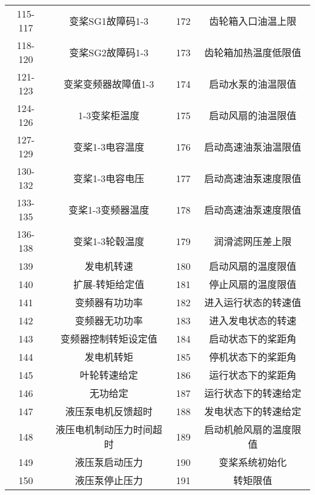 {\begin{table}[H]
{{\begin{tabular}{cccc}
            115-117 & 变桨SG1故障码1-3    & 172     & 齿轮箱入口油温上限    \\
            118-120 & 变桨SG2故障码1-3    & 173     & 齿轮箱加热温度低限值   \\
            121-123 & 变桨变频器故障值1-3    & 174     & 启动水泵的油温限值    \\
            124-126 & 1-3变桨柜温度       & 175     & 启动风扇的油温限值    \\
            127-129 & 变桨1-3电容温度      & 176     & 启动高速油泵油温限值   \\
            130-132 & 变桨1-3电容电压      & 177     & 启动高速油泵速度限值   \\
            133-135 & 变桨1-3变频器温度     & 178     & 启动高速油泵速度限值   \\
            136-138 & 变桨1-3轮毂温度      & 179     & 润滑滤网压差上限     \\
            139     & 发电机转速          & 180     & 启动风扇的温度限值    \\
            140     & 扩展-转矩给定值       & 181     & 停止风扇的温度限值    \\
            141     & 变频器有功功率        & 182     & 进入运行状态的转速值   \\
            142     & 变频器无功功率        & 183     & 进入发电状态的转速    \\
            143     & 变频器控制转矩设定值     & 184     & 启动状态下的桨距角    \\
            144     & 发电机转矩          & 185     & 停机状态下的桨距角    \\
            145     & 叶轮转速给定         & 186     & 运行状态下的桨距角    \\
            146     & 无功给定           & 187     & 运行状态下的转速给定   \\
            147     & 液压泵电机反馈超时      & 188     & 发电状态下的转速给定   \\
            148     & 液压电机制动压力时间超时   & 189     & 启动机舱风扇的温度限值  \\
            149     & 液压泵启动压力        & 190     & 变桨系统初始化      \\
            150     & 液压泵停止压力        & 191     & 转矩限值         \\
            \bottomrule%
            \end{tabular}}}
            \end{table}

}
